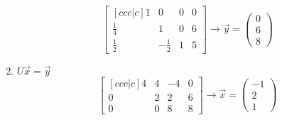 \documentclass[10pt]{article}
\begin{document}
\begin{multicols}{2}
\begin{minipage}{0.95\columnwidth}
\begin{enumerate}
\begin{equation*}
\begin{bmatrix}[ccc|c]
                          1           & 0            & 0 & 0 \\
                          \frac{1}{4} & 1            & 0 & 6 \\
                          \frac{1}{2} & -\frac{1}{2} & 1 & 5
                      \end{bmatrix}
                      \rightarrow \overrightarrow{y} = \begin{pmatrix}
                          0 \\
                          6 \\
                          8
                      \end{pmatrix}
                  \end{equation*}
            \item \(U \overrightarrow{x} = \overrightarrow{y}\)
                  \begin{equation*}
                      \begin{bmatrix}[ccc|c]
                          4 & 4 & -4 & 0 \\
                          0 & 2 & 2  & 6 \\
                          0 & 0 & 8  & 8
                      \end{bmatrix}
                      \rightarrow \overrightarrow{x} = \begin{pmatrix}
                          -1 \\
                          2  \\
                          1
                      \end{pmatrix}
                  \end{equation*}
        \end{enumerate}
    \end{minipage}
\end{multicols}
\end{document}
